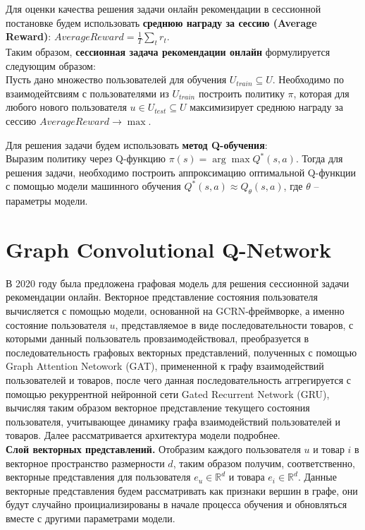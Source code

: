 \documentclass{mipt-thesis-ms}
\begin{document}
Для оценки качества решения задачи онлайн рекомендации в сессионной постановке будем использовать {\bf среднюю награду за сессию (Average Reward)}: $AverageReward = \frac1T \sum_t r_t$.\\

Таким образом, {\bf сессионная задача рекомендации онлайн} формулируется следующим образом:\\
Пусть дано множество пользователей для обучения $U_{train} \subseteq U$. Необходимо по взаимодейтсвиям с пользователями из $U_{train}$ построить политику $\pi$, которая для любого нового пользователя $u \in U_{test} \subseteq U$ максимизирует среднюю награду за сессию $AverageReward \rightarrow \max$.

Для решения задачи будем использовать {\bf метод Q-обучения}: \\Выразим политику через Q-функцию $\pi(s) = \arg \max Q^*(s, a)$. Тогда для решения задачи, необходимо построить аппроксимацию оптимальной Q-функции с помощью модели машинного обучения $Q^*(s, a) \approx Q_{\theta}(s, a)$, где $\theta$ -- параметры модели.


\section{Graph Convolutional Q-Network}
В 2020 году была предложена графовая модель для решения сессионной задачи рекомендации онлайн. Векторное представление состояния пользователя вычисляется с помощью модели, основанной на GCRN-фреймворке, а именно состояние пользователя $u$, представляемое в виде последовательности товаров, с которыми данный пользователь провзаимодействовал, преобразуется в последовательность графовых векторных представлений, полученных с помощью Graph Attention Netowork (GAT), примененной к графу взаимодействий пользователей и товаров, после чего данная последовательность аггрегируется с помощью рекуррентной нейронной сети Gated Recurrent Network (GRU), вычисляя таким образом векторное представление текущего состояния пользователя, учитывающее динамику графа взаимодействий пользователей и товаров. Далее рассматривается архитектура модели подробнее.
\\

{\bf Слой векторных представлений.} Отобразим каждого пользователя $u$ и товар $i$ в векторное пространство размерности $d$, таким образом получим, соответственно, векторные представления для пользователя $e_u \in \mathbb{R}^d$ и товара $e_i \in \mathbb{R}^d$. Данные векторные представления будем рассматривать как признаки вершин в графе, они будут случайно проициализированы в начале процесса обучения и обновляться вместе с другими параметрами модели.\\
\end{document}
